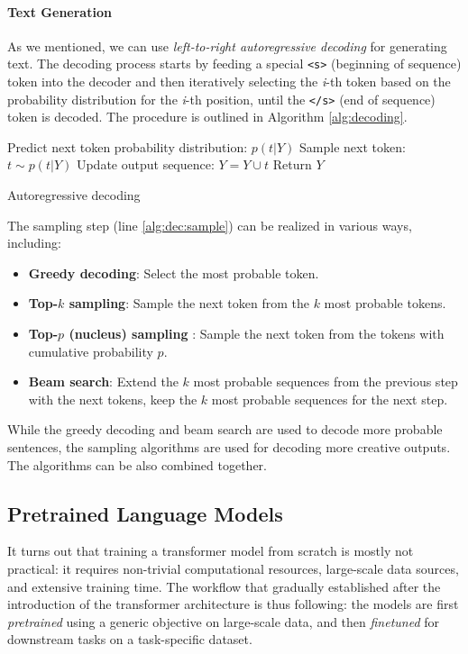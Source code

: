 \paragraph{Text Generation} As we mentioned, we can use \textit{left-to-right autoregressive decoding} for generating text. The decoding process starts by feeding a special \texttt{<s>} (beginning of sequence) token into the decoder and then iteratively selecting the \emph{i}-th token based on the probability distribution for the \emph{i}-th position, until the  \texttt{</s>} (end of sequence) token is decoded. The procedure is outlined in Algorithm \ref{alg:decoding}.
\begin{algorithm}[ht]
    \begin{algorithmic}[1]
        \State Predict next token probability distribution: $p(t | Y)$
        \State Sample next token: $t \sim p(t | Y)$ \label{alg:dec:sample}
        \State Update output sequence: $Y = Y \cup t$
        \EndWhile
        \State Return $Y$
    \end{algorithmic}
    \caption{Autoregressive decoding}
    \label{alg:decoding}
\end{algorithm}

\noindent The sampling step (line \ref{alg:dec:sample}) can be realized in various ways, including:
\begin{itemize}
    \item \textbf{Greedy decoding}: Select the most probable token.
    \item \textbf{Top-$k$ sampling}: Sample the next token from the $k$ most probable tokens.
    \item \textbf{Top-$p$ (nucleus) sampling} \cite{holtzman2019curious}: Sample the next token from the tokens with cumulative probability $p$.
    \item \textbf{Beam search}: Extend the $k$ most probable sequences from the previous step with the next tokens, keep the $k$ most probable sequences for the next step.
\end{itemize}
While the greedy decoding and beam search are used to decode more probable sentences, the sampling algorithms are used for decoding more creative outputs. The algorithms can be also combined together.

\subsection{Pretrained Language Models}
\label{sec:plms}
It turns out that training a transformer model from scratch is mostly not practical: it requires non-trivial computational resources, large-scale data sources, and extensive training time. The workflow that gradually established after the introduction of the transformer architecture is thus following: the models are first \emph{pretrained} using a generic objective on large-scale data, and then \emph{finetuned} for downstream tasks on a task-specific dataset.


